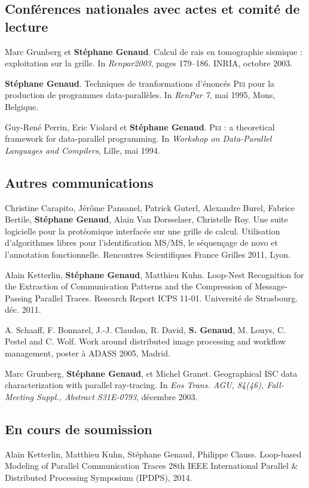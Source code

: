\documentclass[11pt]{article}
\begin{document}
\begin{thebibliography}{99}
\subsection*{Conférences nationales avec actes et comité de lecture}
Marc Grunberg et \textbf{Stéphane Genaud}.
\newblock Calcul de rais en tomographie sismique : exploitation sur la grille.
\newblock In {\em Renpar2003}, pages 179--186. INRIA, octobre 2003.

\textbf{Stéphane Genaud}.
\newblock Techniques de tranformations d'énoncés \textsc{Pei} pour la
  production de programmes data-parallèles.
\newblock In {\em RenPar 7}, mai 1995, Mons, Belgique.

Guy-René Perrin, Eric Violard et \textbf{Stéphane Genaud}.
\newblock \textsc{Pei} : a theoretical framework for data-parallel programming.
\newblock In {\em Workshop on Data-Parallel Languages and Compilers}, Lille, 
mai 1994.
\vspace{3mm}


\subsection*{Autres communications}

Christine Carapito, Jérôme Pansanel, Patrick Guterl, Alexandre Burel, Fabrice 
Bertile, \textbf{Stéphane Genaud}, Alain Van Dorsselaer, Christelle Roy.
\newblock Une suite logicielle pour la protéomique interfacée sur une grille de 
calcul. Utilisation d'algorithmes libres pour l'identification MS/MS, le 
séquençage de novo et l'annotation fonctionnelle.
\newblock Rencontres Scientifiques France Grilles 2011, Lyon.


Alain Ketterlin, \textbf{Stéphane Genaud}, Matthieu Kuhn.
\newblock Loop-Nest Recognition for the Extraction of Communication Patterns 
and the Compression of Message-Passing Parallel Traces.
\newblock Research Report ICPS 11-01. Université de Strasbourg. déc. 2011.


A. Schaaff, F. Bonnarel, J.-J. Claudon, R. David, \textbf{S. Genaud}, M. Louys, 
C. Pestel and C. Wolf.
\newblock Work around distributed image processing and workflow management, 
\newblock poster à ADASS 2005, Madrid.


Marc Grunberg, \textbf{Stéphane Genaud}, et Michel Granet.
\newblock Geographical {ISC} data characterization with parallel ray-tracing.
\newblock In {\em Eos Trans. AGU, 84(46), Fall-Meeting Suppl., Abstract
  S31E-0793}, décembre 2003.


\subsection*{En cours de soumission}


Alain Ketterlin, Matthieu Kuhn, Stéphane Genaud, Philippe Clauss.
\newblock Loop-based Modeling of Parallel Communication Traces
\newblock 28th IEEE International Parallel \& Distributed Processing Symposium (IPDPS),
2014.

\end{thebibliography}
\end{document}
